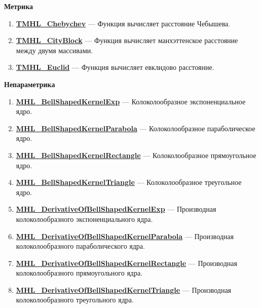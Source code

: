 \documentclass[a4paper,12pt]{article}
\begin{document}
\textbf{Метрика}
\begin{enumerate}

\item \textbf{\hyperref[TMHL_Chebychev]{TMHL\_Chebychev}} --- Функция вычисляет расстояние Чебышева.

\item \textbf{\hyperref[TMHL_CityBlock]{TMHL\_CityBlock}} --- Функция вычисляет манхэттенское расстояние между двумя массивами.

\item \textbf{\hyperref[TMHL_Euclid]{TMHL\_Euclid}} --- Функция вычисляет евклидово расстояние.

\end{enumerate}

\textbf{Непараметрика}
\begin{enumerate}

\item \textbf{\hyperref[MHL_BellShapedKernelExp]{MHL\_BellShapedKernelExp}} --- Колоколообразное экспоненциальное ядро.

\item \textbf{\hyperref[MHL_BellShapedKernelParabola]{MHL\_BellShapedKernelParabola}} --- Колоколообразное параболическое ядро.

\item \textbf{\hyperref[MHL_BellShapedKernelRectangle]{MHL\_BellShapedKernelRectangle}} --- Колоколообразное прямоугольное ядро.

\item \textbf{\hyperref[MHL_BellShapedKernelTriangle]{MHL\_BellShapedKernelTriangle}} --- Колоколообразное треугольное ядро.

\item \textbf{\hyperref[MHL_DerivativeOfBellShapedKernelExp]{MHL\_DerivativeOfBellShapedKernelExp}} --- Производная колоколообразного экспоненциального ядра.

\item \textbf{\hyperref[MHL_DerivativeOfBellShapedKernelParabola]{MHL\_DerivativeOfBellShapedKernelParabola}} --- Производная колоколообразного параболического ядра.

\item \textbf{\hyperref[MHL_DerivativeOfBellShapedKernelRectangle]{MHL\_DerivativeOfBellShapedKernelRectangle}} --- Производная колоколообразного прямоугольного ядра.

\item \textbf{\hyperref[MHL_DerivativeOfBellShapedKernelTriangle]{MHL\_DerivativeOfBellShapedKernelTriangle}} --- Производная колоколообразного треугольного ядра.

\end{enumerate}
\end{document}
